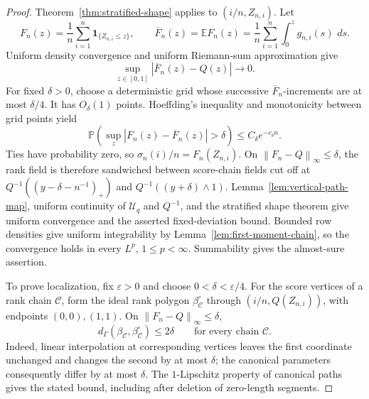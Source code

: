 \documentclass[11pt]{article}
\theoremstyle{remark}
\newcommand{\Pp}{\mathbb P}
\newcommand{\Ee}{\mathbb E}
\newcommand{\one}{\mathbf 1}
\newcommand{\dd}{\,d}
\newcommand{\eps}{\varepsilon}
\newcommand{\calU}{\mathcal U}
\newcommand{\norm}[1]{\left\lVert #1\right\rVert}
\begin{document}
\begin{proof}
Theorem~\ref{thm:stratified-shape} applies to $(i/n,Z_{n,i})$.  Let
\[
 F_n(z)=\frac1n\sum_{i=1}^n\one_{\{Z_{n,i}\le z\}},
 \qquad
 \overline F_n(z)=\Ee F_n(z)
 =\frac1n\sum_{i=1}^n\int_0^zg_{n,i}(s)\,\dd s.
\]
Uniform density convergence and uniform Riemann-sum approximation give
\begin{equation}\label{eq:score-mean-cdf}
 \sup_{z\in[0,1]}|\overline F_n(z)-Q(z)|\longrightarrow0.
\end{equation}
For fixed $\delta>0$, choose a deterministic grid whose successive
$\overline F_n$-increments are at most $\delta/4$.  It has $O_\delta(1)$
points.  Hoeffding's inequality and monotonicity between grid points yield
\begin{equation}\label{eq:score-empirical-cdf}
 \Pp\left(\sup_z|F_n(z)-\overline F_n(z)|>\delta\right)
 \le C_\delta e^{-c_\delta n}.
\end{equation}
Ties have probability zero, so $\sigma_n(i)/n=F_n(Z_{n,i})$.  On
$\norm{F_n-Q}_\infty\le\delta$, the rank field is therefore sandwiched
between score-chain fields cut off at
$Q^{-1}((y-\delta-n^{-1})_+)$ and
$Q^{-1}((y+\delta)\wedge1)$.  Lemma~\ref{lem:vertical-path-map}, uniform
continuity of $\calU_q$ and $Q^{-1}$, and the stratified shape theorem give
uniform convergence and the asserted fixed-deviation bound.  Bounded row
densities give uniform integrability by
Lemma~\ref{lem:first-moment-chain}, so the convergence holds in every
$L^p$, $1\le p<\infty$.  Summability gives the almost-sure assertion.

To prove localization, fix $\eps>0$ and choose $0<\delta<\eps/4$.
For the score vertices of a rank chain $\mathcal C$, form the ideal rank
polygon $\beta^\circ_{\mathcal C}$ through
$(i/n,Q(Z_{n,i}))$, with endpoints $(0,0),(1,1)$.  On
$\norm{F_n-Q}_\infty\le\delta$,
\begin{equation}\label{eq:ideal-rank-polygon}
 d_\Gamma(\beta_{\mathcal C},\beta^\circ_{\mathcal C})\le2\delta
 \qquad\text{for every chain }\mathcal C.
\end{equation}
Indeed, linear interpolation at corresponding vertices leaves the first
coordinate unchanged and changes the second by at most $\delta$; the
canonical parameters consequently differ by at most $\delta$.  The
$1$-Lipschitz property of canonical paths gives the stated bound, including
after deletion of zero-length segments.


\end{proof}
\end{document}
